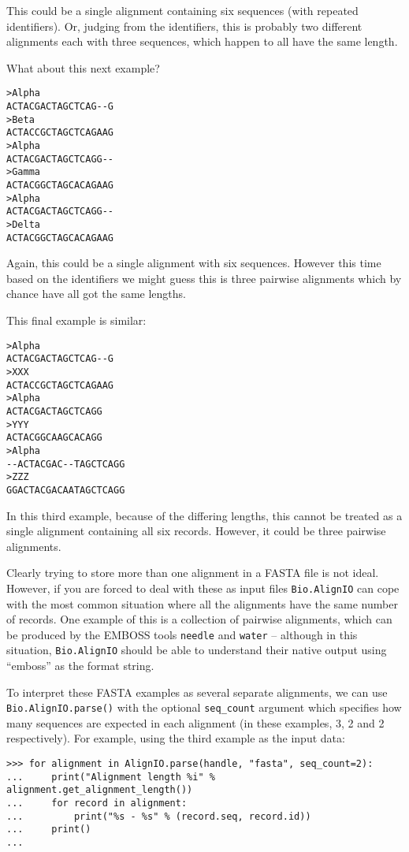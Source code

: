 \noindent This could be a single alignment containing six sequences (with repeated identifiers).  Or, judging from the identifiers, this is probably two different alignments each with three sequences, which happen to all have the same length.

What about this next example?

\begin{verbatim}
>Alpha
ACTACGACTAGCTCAG--G
>Beta
ACTACCGCTAGCTCAGAAG
>Alpha
ACTACGACTAGCTCAGG--
>Gamma
ACTACGGCTAGCACAGAAG
>Alpha
ACTACGACTAGCTCAGG--
>Delta
ACTACGGCTAGCACAGAAG
\end{verbatim}

\noindent Again, this could be a single alignment with six sequences.  However this time based on the identifiers we might guess this is three pairwise alignments which by chance have all got the same lengths.

This final example is similar:

\begin{verbatim}
>Alpha
ACTACGACTAGCTCAG--G
>XXX
ACTACCGCTAGCTCAGAAG
>Alpha
ACTACGACTAGCTCAGG
>YYY
ACTACGGCAAGCACAGG
>Alpha
--ACTACGAC--TAGCTCAGG
>ZZZ
GGACTACGACAATAGCTCAGG
\end{verbatim}

\noindent In this third example, because of the differing lengths, this cannot be treated as a single alignment containing all six records.  However, it could be three pairwise alignments.

Clearly trying to store more than one alignment in a FASTA file is not ideal.  However, if you are forced to deal with these as input files \verb|Bio.AlignIO| can cope with the most common situation where all the alignments have the same number of records.
One example of this is a collection of pairwise alignments, which can be produced by the EMBOSS tools \verb|needle| and \verb|water| -- although in this situation, \verb|Bio.AlignIO| should be able to understand their native output using ``emboss'' as the format string.

To interpret these FASTA examples as several separate alignments, we can use \verb|Bio.AlignIO.parse()| with the optional \verb|seq_count| argument which specifies how many sequences are expected in each alignment (in these examples, 3, 2 and 2 respectively).
For example, using the third example as the input data:

\begin{verbatim}
>>> for alignment in AlignIO.parse(handle, "fasta", seq_count=2):
...     print("Alignment length %i" % alignment.get_alignment_length())
...     for record in alignment:
...         print("%s - %s" % (record.seq, record.id))
...     print()
...
\end{verbatim}

